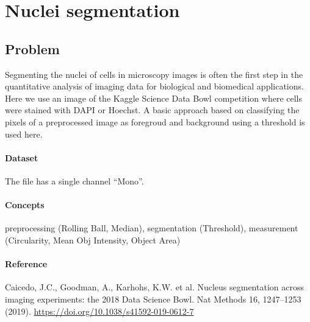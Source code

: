 \section{Nuclei segmentation} \label{sec:nuclei-segmentation}

\subsection*{Problem}

Segmenting the nuclei of cells in microscopy images is often the first step in the quantitative analysis of imaging data for biological and biomedical applications. Here we use an image of the Kaggle Science Data Bowl competition where cells were stained with DAPI or Hoechst. A basic approach based on classifying the pixels of a preprocessed image as foregroud and background using a threshold is used here.

\paragraph{Dataset} The file  has a single channel ``Mono''.

\paragraph{Concepts} preprocessing (Rolling Ball, Median), segmentation (Threshold), measurement (Circularity, Mean Obj Intensity, Object Area)


\paragraph{Reference} Caicedo, J.C., Goodman, A., Karhohs, K.W. et al. Nucleus segmentation across imaging experiments: the 2018 Data Science Bowl. Nat Methods 16, 1247–1253 (2019). \url{https://doi.org/10.1038/s41592-019-0612-7}


